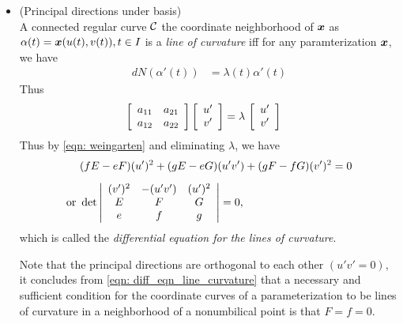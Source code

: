\documentclass[11pt]{article}
\begin{document}
\begin{itemize}
\item (Principal directions under basis)\\
A connected regular curve ${\mathcal C}$ the coordinate neighborhood of $\boldsymbol{x}$ as $\alpha(t) = \boldsymbol{x}(u(t), v(t)), t\in I$ is a \emph{line of curvature} iff for any paramterization $\boldsymbol{x}$, we have 
\begin{align*}
dN(\alpha'(t)) &= \lambda(t)\alpha'(t)
\end{align*}
Thus
\begin{align*}
\left[\begin{array}{cc}
a_{11} & a_{21} \\ 
a_{12} & a_{22}
\end{array} \right]\left[\begin{array}{c}
u' \\ 
v'
\end{array} \right] &= \lambda\,\left[\begin{array}{c}
u' \\ 
v'
\end{array} \right]
\end{align*}
Thus by \eqref{eqn: weingarten} and eliminating $\lambda$, we have
\begin{align}
&(fE- eF)(u')^{2} + (gE-eG)(u'v')+ (gF-fG)(v')^{2} = 0\nonumber\\[5pt]
\text{or }& 
\det\left\lvert \begin{array}{ccc}
(v')^{2} & -(u'v') & (u')^{2}  \\ 
E & F & G \\ 
e & f & g
\end{array}  \right\rvert = 0, \label{eqn: diff_eqn_line_curvature}
\end{align} which is called the \emph{differential equation for the lines of curvature}.

Note that the principal directions are orthogonal to each other $(u'v' =0)$, it concludes from \eqref{eqn: diff_eqn_line_curvature} that a necessary and sufficient condition for the coordinate curves of a parameterization to be lines of curvature in a neighborhood of a nonumbilical point is that $F=f = 0$. 
\end{itemize}
\end{document}
